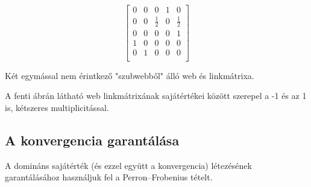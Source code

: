 \documentclass[12pt,a4paper]{article}
\begin{document}
\vspace{0.3cm}
\begin{minipage}{0.4\textwidth}
	\begin{center}
	\end{center}
\end{minipage}
\begin{minipage}{0.5\textwidth}
	\begin{center}
		\[
		\begin{bmatrix}
		0 & 0 & 0 & 1 & 0 \\
		0 & 0 & \frac{1}{2} & 0 & \frac{1}{2} \\
		0 & 0 & 0 & 0 & 1 \\
		1 & 0 & 0 & 0 & 0 \\
		0 & 1 & 0 & 0 & 0 \\
		\end{bmatrix}
		\]
	\end{center}
\end{minipage}
\vspace{0.3cm}
\newline
\centerline{Két egymással nem érintkező "szubwebből" álló web és linkmátrixa.}
\vspace{0.3cm}

A fenti ábrán látható web linkmátrixának sajátértékei között szerepel a -1 és az 1 is, kétszeres multiplicitással.

\subsection{A konvergencia garantálása}\label{konvergencia_garantalas}

A domináns sajátérték (és ezzel együtt a konvergencia) létezésének garantálásához használjuk fel a Perron–Frobenius tételt.
\end{document}
